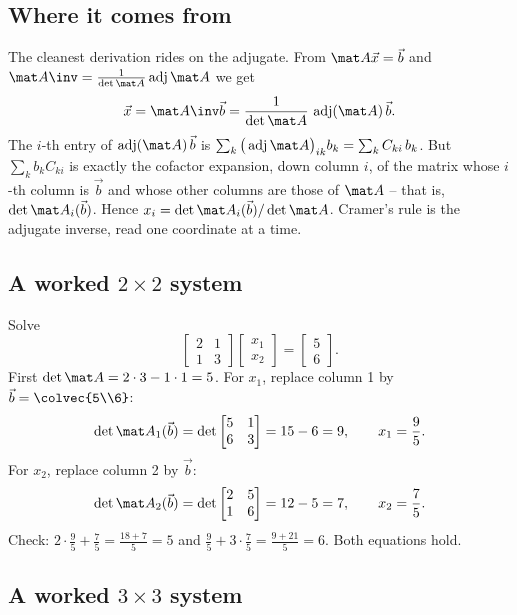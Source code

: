 \subsection{Where it comes from}

The cleanest derivation rides on the adjugate. From $\mat A\vec x=\vec b$ and $\mat A\inv=\frac{1}{\det
\mat A}\operatorname{adj}\mat A$ we get
\[
\vec x=\mat A\inv\vec b=\frac{1}{\det\mat A}\,\operatorname{adj}(\mat A)\,\vec b.
\]
The $i$-th entry of $\operatorname{adj}(\mat A)\,\vec b$ is $\sum_k\big(\operatorname{adj}\mat
A\big)_{ik}b_k=\sum_k C_{ki}\,b_k$. But $\sum_k b_k C_{ki}$ is exactly the cofactor expansion, down
column $i$, of the matrix whose $i$-th column is $\vec b$ and whose other columns are those of $\mat
A$ -- that is, $\det\mat A_i(\vec b)$. Hence $x_i=\det\mat A_i(\vec b)/\det\mat A$. Cramer's rule is
the adjugate inverse, read one coordinate at a time.

\subsection{A worked \texorpdfstring{$2\times2$}{2x2} system}

Solve
\[
\begin{bmatrix} 2 & 1 \\ 1 & 3 \end{bmatrix}\begin{bmatrix} x_1 \\ x_2\end{bmatrix}
=\begin{bmatrix} 5 \\ 6\end{bmatrix}.
\]
First $\det\mat A=2\cdot3-1\cdot1=5$. For $x_1$, replace column 1 by $\vec b=\colvec{5\\6}$:
\[
\det\mat A_1(\vec b)=\det\begin{bmatrix} 5 & 1 \\ 6 & 3\end{bmatrix}=15-6=9,
\qquad x_1=\frac{9}{5}.
\]
For $x_2$, replace column 2 by $\vec b$:
\[
\det\mat A_2(\vec b)=\det\begin{bmatrix} 2 & 5 \\ 1 & 6\end{bmatrix}=12-5=7,
\qquad x_2=\frac{7}{5}.
\]
Check: $2\cdot\frac95+\frac75=\frac{18+7}{5}=5$ and $\frac95+3\cdot\frac75=\frac{9+21}{5}=6$. Both
equations hold.

\subsection{A worked \texorpdfstring{$3\times3$}{3x3} system}

